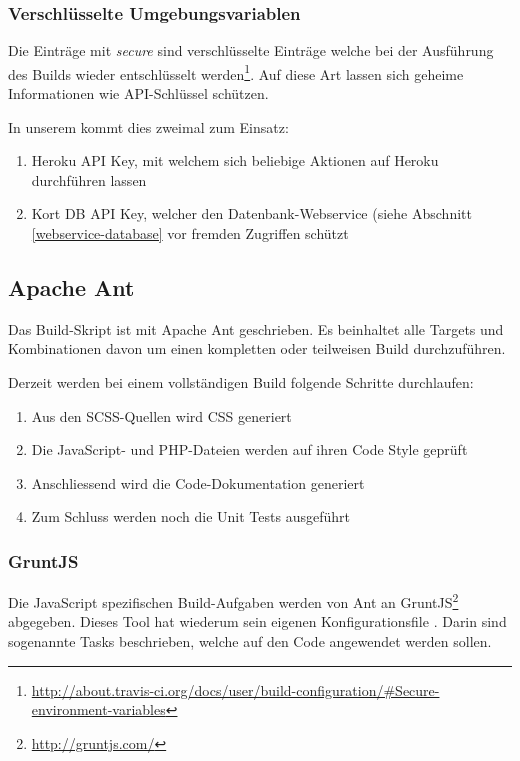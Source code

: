 \subsubsection{Verschlüsselte Umgebungsvariablen}
Die Einträge mit \emph{secure} sind verschlüsselte Einträge welche bei der Ausführung des Builds wieder entschlüsselt werden\footnote{\url{http://about.travis-ci.org/docs/user/build-configuration/\#Secure-environment-variables}}.
Auf diese Art lassen sich geheime Informationen wie API-Schlüssel schützen.

In unserem  kommt dies zweimal zum Einsatz:
\begin{enumerate}
\item Heroku API Key, mit welchem sich beliebige Aktionen auf Heroku durchführen lassen
\item Kort DB API Key, welcher den Datenbank-Webservice (siehe Abschnitt \ref{webservice-database} vor fremden Zugriffen schützt
\end{enumerate}

\subsection{Apache Ant}
Das Build-Skript ist mit Apache Ant geschrieben.
Es beinhaltet alle Targets und Kombinationen davon um einen kompletten oder teilweisen Build durchzuführen.

Derzeit werden bei einem vollständigen Build folgende Schritte durchlaufen:
\begin{enumerate}
\item Aus den SCSS-Quellen wird CSS generiert
\item Die JavaScript- und PHP-Dateien werden auf ihren Code Style geprüft
\item Anschliessend wird die Code-Dokumentation generiert
\item Zum Schluss werden noch die Unit Tests ausgeführt
\end{enumerate}

\subsubsection{GruntJS}
\label{gruntjs}
Die JavaScript spezifischen Build-Aufgaben werden von Ant an GruntJS\footnote{\url{http://gruntjs.com/}} abgegeben.
Dieses Tool hat wiederum sein eigenen Konfigurationsfile .
Darin sind sogenannte Tasks beschrieben, welche auf den Code angewendet werden sollen.

